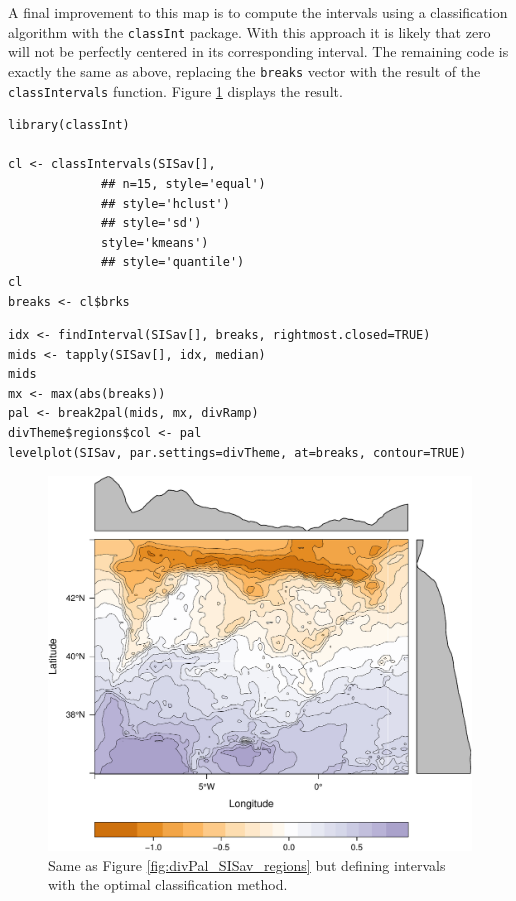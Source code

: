 A final improvement to this map is to compute the intervals using a
classification algorithm with the \texttt{classInt} package. With this
approach it is likely that zero will not be perfectly centered in its
corresponding interval. The remaining code is exactly the same as
above, replacing the \texttt{breaks} vector with the result of the
\texttt{classIntervals} function. Figure \ref{fig:divPalSISav_classInt}
displays the result.


\lstset{language=R,numbers=none}
\begin{lstlisting}
library(classInt)

cl <- classIntervals(SISav[],
		     ## n=15, style='equal')
		     ## style='hclust')
		     ## style='sd')
		     style='kmeans')
		     ## style='quantile')
cl
breaks <- cl$brks
\end{lstlisting}

\lstset{language=R,numbers=none}
\begin{lstlisting}
idx <- findInterval(SISav[], breaks, rightmost.closed=TRUE)
mids <- tapply(SISav[], idx, median)
mids
mx <- max(abs(breaks))
pal <- break2pal(mids, mx, divRamp)
divTheme$regions$col <- pal
levelplot(SISav, par.settings=divTheme, at=breaks, contour=TRUE)
\end{lstlisting}

\begin{figure}[htb]
\centering
\includegraphics[width=.9\linewidth]{figs/divPalSISav_classInt.pdf}
\caption{\label{fig:divPalSISav_classInt}Same as Figure \ref{fig:divPal_SISav_regions} but defining intervals with the optimal classification method.}
\end{figure}

